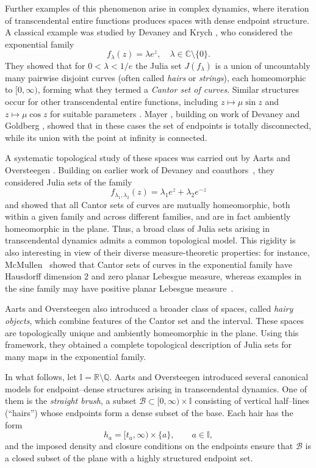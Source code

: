 \documentclass[11pt]{amsart}
\begin{document}
Further examples of this phenomenon arise in complex dynamics, where iteration of transcendental entire functions produces spaces with dense endpoint structure. A classical example was studied by Devaney and Krych \cite{devaney1984dynamics}, who considered the exponential family
\[
f_{\lambda}(z) = \lambda e^z, \quad \lambda \in \mathbb{C} \setminus \{0\}.
\]
They showed that for $0<\lambda<1/e$ the Julia set $J(f_{\lambda})$ is a union of uncountably many pairwise disjoint curves (often called \emph{hairs} or \emph{strings}), each homeomorphic to $[0,\infty)$, forming what they termed a \emph{Cantor set of curves}. Similar structures occur for other transcendental entire functions, including $z\mapsto \mu\sin z$ and $z\mapsto \mu\cos z$ for suitable parameters \cite{DevaneyTangerman}. Mayer \cite{Mayer1990}, building on work of Devaney and Goldberg \cite{DevaneyGoldberg}, showed that in these cases the set of endpoints is totally disconnected, while its union with the point at infinity is connected.

A systematic topological study of these spaces was carried out by Aarts and Oversteegen \cite{AO93}. Building on earlier work of Devaney and coauthors~\cite{Devaney1984,DevaneyTangerman,Devaney1993,devaney1984dynamics}, they considered Julia sets of the family
\[
f_{\lambda_1,\lambda_2}(z)=\lambda_1 e^z+\lambda_2 e^{-z}
\]
and showed that all Cantor sets of curves are mutually homeomorphic, both within a given family and across different families, and are in fact ambiently homeomorphic in the plane. Thus, a broad class of Julia sets arising in transcendental dynamics admits a common topological model. This rigidity is also interesting in view of their diverse measure-theoretic properties: for instance, McMullen~\cite{McMullen1987} showed that Cantor sets of curves in the exponential family have Hausdorff dimension $2$ and zero planar Lebesgue measure, whereas examples in the sine family may have positive planar Lebesgue measure~\cite{EremenkoLyubich1992,McMullen1987}.

Aarts and Oversteegen \cite{AO93} also introduced a broader class of spaces, called \emph{hairy objects}, which combine features of the Cantor set and the interval. These spaces are topologically unique and ambiently homeomorphic in the plane. Using this framework, they obtained a complete topological description of Julia sets for many maps in the exponential family.

In what follows, let $\mathbb{I}=\mathbb{R}\setminus\mathbb{Q}$. Aarts and Oversteegen \cite{AO93} introduced several canonical models for endpoint--dense structures arising in transcendental dynamics. One of them is the \emph{straight brush}, a subset $\mathcal{B}\subset [0,\infty)\times \mathbb{I}$ consisting of vertical half--lines (``hairs'') whose endpoints form a dense subset of the base. Each hair has the form
\[
h_a=[t_a,\infty)\times\{a\}, \qquad a\in\mathbb{I},
\]
and the imposed density and closure conditions on the endpoints ensure that $\mathcal{B}$ is a closed subset of the plane with a highly structured endpoint set.
\end{document}
